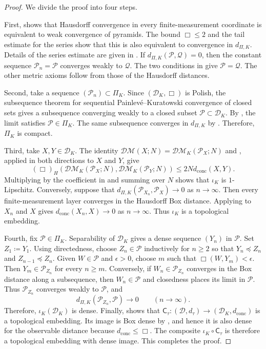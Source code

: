 \documentclass[11pt]{amsart}
\theoremstyle{plain}
\theoremstyle{definition}
\theoremstyle{remark}
\newcommand{\D}{\mathcal D}
\newcommand{\DK}{\mathcal D_K}
\newcommand{\DM}{\mathcal{DM}}
\newcommand{\dconc}{d_{\mathrm{conc}}}
\newcommand{\dtau}{d_{\tau}}
\begin{document}
\begin{proof}
We divide the proof into four steps.

First,  shows that Hausdorff convergence in every finite-measurement coordinate is equivalent to weak convergence of pyramids. The bound $\Box\leq2$ and the tail estimate for the series show that this is also equivalent to convergence in $d_{\Pi,K}$. Details of the series estimate are given in . If $d_{\Pi,K}(\mathcal P,\mathcal Q)=0$, then the constant sequence $\mathcal P_n=\mathcal P$ converges weakly to $\mathcal Q$. The two conditions in  give $\mathcal P=\mathcal Q$. The other metric axioms follow from those of the Hausdorff distances.

Second, take a sequence $(\mathcal P_n)\subset\Pi_K$. Since $(\DK,\Box)$ is Polish, the subsequence theorem for sequential Painlev\'e--Kuratowski convergence of closed sets \cite[Theorem~5.2.12]{beer1993topologies} gives a subsequence converging weakly to a closed subset $\mathcal P\subset\DK$. By , the limit satisfies $\mathcal P\in\Pi_K$. The same subsequence converges in $d_{\Pi,K}$ by . Therefore, $\Pi_K$ is compact.

Third, take $X,Y\in\DK$. The identity $\DM(X;N)=\DM_K(\mathcal P_X;N)$ and , applied in both directions to $X$ and $Y$, give
\[
(\Box)_H(\DM_K(\mathcal P_X;N),\DM_K(\mathcal P_Y;N))\leq2N\dconc(X,Y).
\]
Multiplying by the coefficient in  and summing over $N$ shows that $\iota_K$ is $1$-Lipschitz. Conversely, suppose that $d_{\Pi,K}(\mathcal P_{X_n},\mathcal P_X)\to0$ as $n\to\infty$. Then every finite-measurement layer converges in the Hausdorff Box distance. Applying  to $X_n$ and $X$ gives $\dconc(X_n,X)\to0$ as $n\to\infty$. Thus $\iota_K$ is a topological embedding.

Fourth, fix $\mathcal P\in\Pi_K$. Separability of $\DK$ gives a dense sequence $(Y_n)$ in $\mathcal P$. Set $Z_1\coloneqq Y_1$. Using directedness, choose $Z_n\in\mathcal P$ inductively for $n\geq2$ so that $Y_n\preceq Z_n$ and $Z_{n-1}\preceq Z_n$. Given $W\in\mathcal P$ and $\epsilon>0$, choose $m$ such that $\Box(W,Y_m)<\epsilon$. Then $Y_m\in\mathcal P_{Z_n}$ for every $n\geq m$. Conversely, if $W_n\in\mathcal P_{Z_n}$ converges in the Box distance along a subsequence, then $W_n\in\mathcal P$ and closedness places its limit in $\mathcal P$. Thus $\mathcal P_{Z_n}$ converges weakly to $\mathcal P$, and
\[
d_{\Pi,K}(\mathcal P_{Z_n},\mathcal P)\longrightarrow0\qquad(n\to\infty).
\]
Therefore, $\iota_K(\DK)$ is dense. Finally,  shows that $\mathsf C_\tau\colon(\D,\dtau)\to(\DK,\dconc)$ is a topological embedding. Its image is Box dense by , and hence it is also dense for the observable distance because $\dconc\leq\Box$. The composite $\iota_K\circ\mathsf C_\tau$ is therefore a topological embedding with dense image. This completes the proof.
\end{proof}
\end{document}
